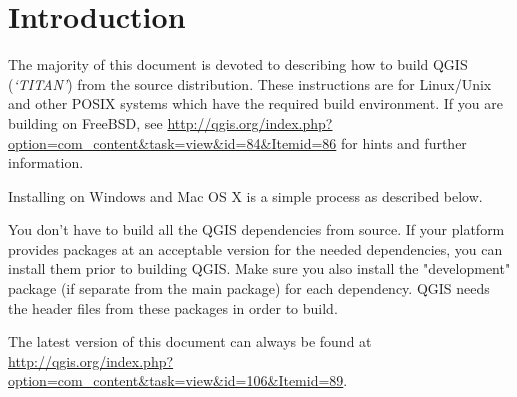 
\section{Introduction}\label{label_introduction}
\setcounter{page}{1}

The majority of this document is devoted to describing how to build
QGIS~\CURRENT
(\textit{`TITAN'}) from the source distribution. These instructions are for
Linux/Unix and other POSIX systems which have the required build
environment. If you are building on FreeBSD, see
\url{http://qgis.org/index.php?option=com_content&task=view&id=84&Itemid=86} for hints and further
information.

Installing on Windows and Mac OS X is a simple process as described
below.

You don't have to build all the QGIS dependencies from source. If your
platform provides packages at an acceptable version for the needed
dependencies, you can install them prior to building QGIS. Make sure you
also install the "development" package (if separate from the main package)
for each dependency. QGIS needs the header files from these packages in
order to build. 

The latest version of this document can always be found at 
\url{http://qgis.org/index.php?option=com_content&task=view&id=106&Itemid=89}.
